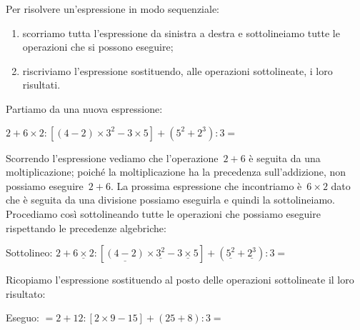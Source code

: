 \begin{procedura}{}{}
 Per risolvere un'espressione in modo sequenziale:
\begin{enumerate} [noitemsep] 
\item scorriamo tutta l'espressione da sinistra a destra 
e sottolineiamo tutte le operazioni che si possono eseguire;
\item riscriviamo l'espressione sostituendo, alle operazioni sottolineate,
i loro risultati.
\end{enumerate}
\end{procedura}

Partiamo da una nuova espressione:

\(2 + 6 \times 2 : 
 \left[ \left(4 -2 \right) \times 3^{2} - 3 \times 5 \right] +
 \left( 5^{2} + 2^{3} \right) : 3 =\)

Scorrendo l'espressione vediamo che l'operazione~\(2 + 6\) è seguita da una 
moltiplicazione; poiché la moltiplicazione ha la precedenza sull'addizione,
non possiamo eseguire~\(2 + 6\). La prossima espressione che incontriamo 
è~\(6 \times 2\) dato che è seguita da una divisione possiamo eseguirla e 
quindi la sottolineiamo. Procediamo così sottolineando tutte le operazioni
che possiamo eseguire rispettando le precedenze algebriche:

\noindent Sottolineo: \hspace{28mm} \(2 + 
 \underline{6 \times 2} : \left[ \underline{\left(4 -2 \right)} 
   \times \underline{3^{2}} - 
   \underline{3 \times 5} \right] +
 \left( \underline{5^{2}} + \underline{2^{3}} \right) : 3 =\)

Ricopiamo l'espressione sostituendo al posto delle operazioni 
sottolineate il loro risultato:

\noindent Eseguo: \hspace{28.7mm} \(= 2 + 
 12 : \left[ 2 \times 9 - 15 \right] +
 \left( 25 + 8 \right) : 3 =\)

